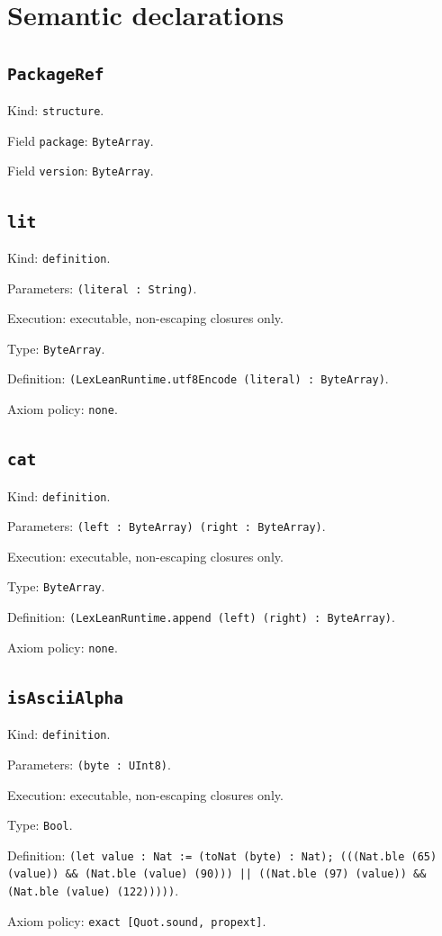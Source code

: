 \documentclass[11pt]{article}
\begin{document}
\section*{Semantic declarations}
\subsection*{\texttt{PackageRef}}
\noindent Kind: \texttt{structure}.\par
\noindent Field \texttt{package}: \texttt{ByteArray}.\par
\noindent Field \texttt{version}: \texttt{ByteArray}.\par
\subsection*{\texttt{lit}}
\noindent Kind: \texttt{definition}.\par
\noindent Parameters: \texttt{(literal : String)}.\par
\noindent Execution: executable, non-escaping closures only.\par
\noindent Type: \texttt{ByteArray}.\par
\noindent Definition: \texttt{(LexLeanRuntime.utf8Encode (literal) : ByteArray)}.\par
\noindent Axiom policy: \texttt{none}.\par
\subsection*{\texttt{cat}}
\noindent Kind: \texttt{definition}.\par
\noindent Parameters: \texttt{(left : ByteArray) (right : ByteArray)}.\par
\noindent Execution: executable, non-escaping closures only.\par
\noindent Type: \texttt{ByteArray}.\par
\noindent Definition: \texttt{(LexLeanRuntime.append (left) (right) : ByteArray)}.\par
\noindent Axiom policy: \texttt{none}.\par
\subsection*{\texttt{isAsciiAlpha}}
\noindent Kind: \texttt{definition}.\par
\noindent Parameters: \texttt{(byte : UInt8)}.\par
\noindent Execution: executable, non-escaping closures only.\par
\noindent Type: \texttt{Bool}.\par
\noindent Definition: \texttt{(let value : Nat := (toNat (byte) : Nat); (((Nat.ble (65) (value)) \&\& (Nat.ble (value) (90))) || ((Nat.ble (97) (value)) \&\& (Nat.ble (value) (122)))))}.\par
\noindent Axiom policy: \texttt{exact [Quot.sound, propext]}.\par
\end{document}
